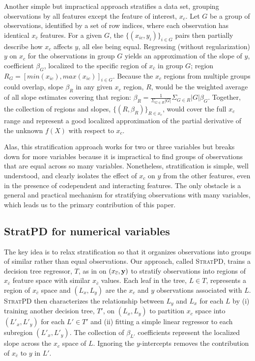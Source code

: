 \documentclass[12pt]{article}
\newcommand{\spd}{\fontfamily{cmr}\textsc{\small StratPD}}
\newcommand{\xnc}{$x_{\overline{c}}$}
\begin{document}
Another simple but impractical approach stratifies a data set, grouping observations by all features except the feature of interest, $x_c$.  Let $G$ be a group of observations, identified by a set of row indices, where each observation has identical \xnc{} features. For a given $G$, the $\{(x_{ic},  y_i)\}_{i \in G}$ pairs then partially describe how $x_c$ affects $y$, all else being equal.  Regressing (without regularization) $y$ on $x_c$ for the observations in group $G$ yields an approximation of the slope of $y$, coefficient $\beta_G$, localized to the specific region of \xnc{} in group $G$; region $R_G = [min(x_{ic}), max(x_{ic})]_{i \in G}$. Because the $x_c$ regions from multiple groups could overlap, slope $\beta_R$ in any given $x_c$ region, $R$, would be the weighted average of all slope estimates covering that region: $\beta_R = \frac{1}{\Sigma_{G \in R} |G|}\Sigma_{G \in R}|G|\beta_G$. Together, the collection of regions and slopes, $\{(R, \beta_R)\}_{R \in x_c}$, would cover the full $x_c$ range and represent a good localized approximation of the partial derivative of the unknown $f(X)$ with respect to $x_c$.

Alas, this stratification approach works for two or three variables but breaks down for more variables because it is impractical to find groups of observations that are equal across so many variables.  Nonetheless, stratification is simple, well understood, and clearly isolates the effect of $x_c$ on $y$ from the other features, even in the presence of codependent and interacting features.  The only obstacle is a general and practical mechanism for stratifying observations with many variables, which leads us to the primary contribution of this paper.

\subsection{StratPD for numerical variables}

The key idea is to relax stratification so that it organizes observations into groups of similar rather than equal observations.  Our approach, called \spd, trains a decision tree regressor, $T$, as in \cite{CART} on $(x_{\overline{c}}, {\bf y})$ to stratify observations into regions of \xnc{} feature space with similar \xnc{} values. Each leaf in the tree, $L \in T$, represents a region of \xnc{} space and $(L_x, L_y)$ are the $x_c$ and $y$ observations associated with $L$. \spd{} then characterizes the relationship between $L_y$ and $L_x$ for each $L$ by (i) training another decision tree, $T'$, on $(L_x, L_y)$ to partition $x_c$ space into $(L'_x, L'_y)$ for each $L' \in T'$ and (ii) fitting a simple linear regressor to each subregion $(L'_x, L'_y)$.  The collection of $\beta_{L'}$ coefficients represent the localized slope across the $x_c$ space of $L$. Ignoring the $y$-intercepts removes the contribution of \xnc{} to $y$ in $L'$.
\end{document}
